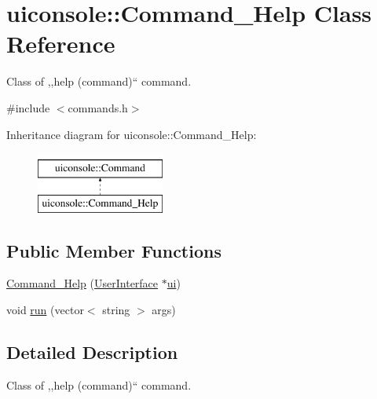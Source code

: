 \hypertarget{classuiconsole_1_1Command__Help}{
\section{uiconsole::Command\_\-Help Class Reference}
\label{d0/d3d/classuiconsole_1_1Command__Help}
}


Class of ,,help (command)`` command.  




{\ttfamily \#include $<$commands.h$>$}

Inheritance diagram for uiconsole::Command\_\-Help:\begin{figure}[H]
\begin{center}
\leavevmode
\includegraphics[height=2.000000cm]{d0/d3d/classuiconsole_1_1Command__Help}
\end{center}
\end{figure}
\subsection*{Public Member Functions}
\begin{DoxyCompactItemize}
\item 
\hyperlink{classuiconsole_1_1Command__Help_a4c5f133a08fd1e534660d80f539c604d}{Command\_\-Help} (\hyperlink{classUserInterface}{UserInterface} $\ast$\hyperlink{classuiconsole_1_1Command_ab43ed5152860c099f858d62f9f556699}{ui})
\item 
void \hyperlink{classuiconsole_1_1Command__Help_a79203580b82e0b17883096640d83e6ff}{run} (vector$<$ string $>$ args)
\end{DoxyCompactItemize}


\subsection{Detailed Description}
Class of ,,help (command)`` command. 

